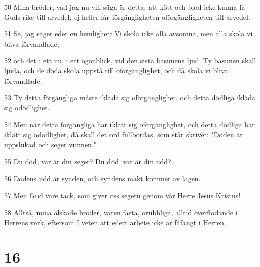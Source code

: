 \par 50 Mina bröder, vad jag nu vill säga är detta, att kött och blod icke kunna få Guds rike till arvedel; ej heller får förgängligheten oförgängligheten till arvedel.
\par 51 Se, jag säger eder en hemlighet: Vi skola icke alla avsomna, men alla skola vi bliva förvandlade,
\par 52 och det i ett nu, i ett ögonblick, vid den sista basunens ljud. Ty basunen skall ljuda, och de döda skola uppstå till oförgänglighet, och då skola vi bliva förvandlade.
\par 53 Ty detta förgängliga måste ikläda sig oförgänglighet, och detta dödliga ikläda sig odödlighet.
\par 54 Men när detta förgängliga har iklätt sig oförgänglighet, och detta dödliga har iklätt sig odödlighet, då skall det ord fullbordas, som står skrivet: "Döden är uppslukad och seger vunnen."
\par 55 Du död, var är din seger? Du död, var är din udd?
\par 56 Dödens udd är synden, och syndens makt kommer av lagen.
\par 57 Men Gud vare tack, som giver oss segern genom vår Herre Jesus Kristus!
\par 58 Alltså, mina älskade bröder, varen fasta, orubbliga, alltid överflödande i Herrens verk, eftersom I veten att edert arbete icke är fåfängt i Herren.

\chapter{16}

